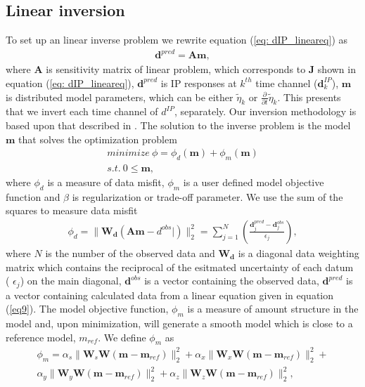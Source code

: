 \documentclass[a4paper, 11pt]{article}
\newcommand{\peta}{\tilde{\eta}}
\begin{document}
\subsection{Linear inversion}
To set up an linear inverse problem we rewrite equation (\ref{eq: dIP_lineareq}) as
\begin{eqnarray}
  \mathbf{d}^{pred} = \mathbf{A}\mathbf{m},
  \label{eq9}
\end{eqnarray}
where $\mathbf{A}$ is sensitivity matrix of linear problem, which corresponds to $\mathbf{J}$ shown in equation (\ref{eq: dIP_lineareq}), $\mathbf{d}^{pred}$ is IP responses at $k^{th}$ time channel ($\mathbf{d}^{IP}_k$), $\mathbf{m}$ is distributed model parameters, which can be either $\peta_{k}$ or $\frac{\partial}{\partial t}\peta_{k}$. This presents that we invert each time channel of $d^{IP}$, separately. Our inversion methodology is based upon that described in \cite{doug1994}. The solution to the inverse problem is the model $\mathbf{m}$ that solves the optimization problem
\begin{eqnarray}
  minimize \ \phi =  \phi_d(\mathbf{m}) + \phi_m(\mathbf{m})\nonumber \\
  s.t. \ 0 \le \mathbf{m},
  \label{eq10}
\end{eqnarray}
where $\phi_d$ is a measure of data misfit, $\phi_m$ is a user defined model objective function and $\beta$ is regularization or trade-off parameter. We use the sum of the squares to measure data misfit
\begin{eqnarray}
  \phi_d = \| \mathbf{W_d}(\mathbf{A}\mathbf{m}-d^{obs}|)\|^2_2 =
  \sum^N_{j=1}(\frac{\mathbf{d}^{pred}_j-\mathbf{d}^{obs}_j}{\epsilon_j}),
  \label{eq11}
\end{eqnarray}
where $N$ is the number of the observed data and $\mathbf{W_d}$ is a diagonal data weighting matrix which contains the reciprocal of the esitmated uncertainty of each datum (
$\epsilon_j$) on the main diagonal,  $\mathbf{d}^{obs}$ is a vector containing the observed data, $\mathbf{d}^{pred}$ is a vector containing calculated data from a linear equation given in equation (\ref{eq9}).
The model objective function, $\phi_m$ is a measure of amount structure in the model and, upon minimization, will generate a smooth model which is close to a reference model, $m_{ref}$. We define $\phi_m$ as
\begin{eqnarray}
  \phi_m = \alpha_s\| \mathbf{W}_s\mathbf{W}(\mathbf{m}-\mathbf{m}_{ref})\|^2_2+
       \alpha_x\| \mathbf{W}_x\mathbf{W}(\mathbf{m}-\mathbf{m}_{ref})\|^2_2+ \nonumber \\
       \alpha_y\| \mathbf{W}_y\mathbf{W}(\mathbf{m}-\mathbf{m}_{ref})\|^2_2+
       \alpha_z\| \mathbf{W}_z\mathbf{W}(\mathbf{m}-\mathbf{m}_{ref})\|^2_2,
  \label{eq12}
\end{eqnarray}
\end{document}
